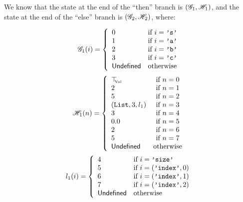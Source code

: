 We know that the state at the end of the \enquote{then} branch is \((\mathscr{G}_1, \mathscr{H}_1)\), and the
state at the end of the \enquote{else} branch is \((\mathscr{G}_2, \mathscr{H}_2)\), where:
\\[.4em]

\begin{minipage}{0.45\textwidth}
  \[\mathscr{G}_1(i) = \left\{
    \begin{array}{ll}
      0 & \text{if } i = \texttt{'s'} \\
      1 & \text{if } i = \texttt{'a'} \\
      2 & \text{if } i = \texttt{'b'} \\
      3 & \text{if } i = \texttt{'c'} \\
      \mathsf{Undefined}      & \text{otherwise} \\
    \end{array}
  \right.\]
  \[\mathscr{H}_1(n) = \left\{
    \begin{array}{lcl}
      \top_{\hspace{-1mm}{\text{\tiny{Val}}}} & \text{if } n = 0 \\
      2 & \text{if } n = 1 \\
      5 & \text{if } n = 2 \\
      (\texttt{List}, 3, l_1) & \text{if } n = 3 \\
      3 & \text{if } n = 4 \\
      0.0 & \text{if } n = 5 \\
      2 & \text{if } n = 6 \\
      5 & \text{if } n = 7 \\
      \mathsf{Undefined} & \text{otherwise} \\
    \end{array}
  \right.\]
  \[l_1(i) = \left\{
    \begin{array}{ll}
      4 & \text{if } i = \texttt{'size'} \\
      5 & \text{if } i = (\texttt{'index'}, 0) \\
      6 & \text{if } i = (\texttt{'index'}, 1) \\
      7 & \text{if } i = (\texttt{'index'}, 2) \\
      \mathsf{Undefined}      & \text{otherwise} \\
    \end{array}
  \right.\]
\end{minipage}\hfill%
